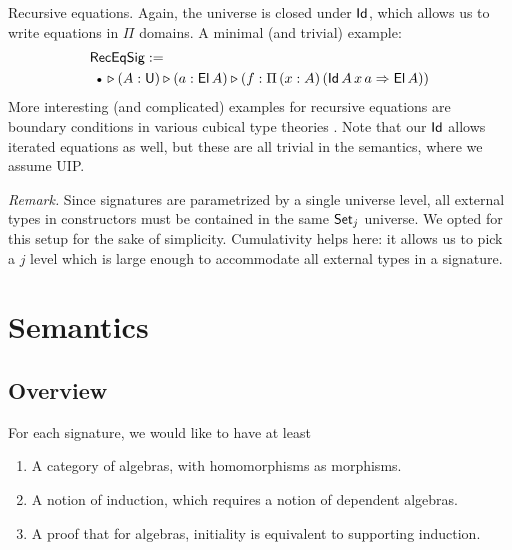 \documentclass[sigplan,review,anonymous]{acmart}\settopmatter{printfolios=true,printccs=false,printacmref=false}
\makeatletter
\newcommand{\Lift}{\Uparrow}
\newcommand{\ext}{\triangleright}
\newcommand{\emptycon}{\scaleobj{.75}\bullet}
\newcommand{\Pii}{\Pi}
\newcommand{\appitt}{\mathop{{\scriptstyle @}}}
\newcommand{\IdU}{\mathsf{IdU}}
\newcommand{\arri}{\Rightarrow}
\makeatother
\begin{document}

\begin{example}{Recursive equations}. Again, the universe is closed under $\mathsf{Id}$, which allows us to write equations
in $\Pii$ domains. A minimal (and trivial) example:
\begin{alignat*}{3}
  & \mathsf{RecEqSig} :=\\
  & \hspace{0.5em}\emptycon\,\ext (A : \U) \ext (a : \El\,A)\ext (f : \Pii\,(x : A)\,(\Id\,A\,x\,a\arri\El\,A))
\end{alignat*}
More interesting (and complicated) examples for recursive equations are boundary
conditions in various cubical type theories \cite{cohen2016cubical, angiuli2016computational, angiuli2018cartesian}. Note that our $\mathsf{Id}$
allows iterated equations as well, but these are all trivial in the semantics,
where we assume UIP.
\end{example}


\emph{Remark.} Since signatures are parametrized by a single universe level, all
external types in constructors must be contained in the same $\mathsf{Set}_j$
universe. We opted for this setup for the sake of simplicity. Cumulativity helps
here: it allows us to pick a $j$ level which is large enough to accommodate all
external types in a signature.


\section{Semantics}
\label{sec:semantics}

\subsection{Overview}\label{sec:overview}

For each signature, we would like to have at least
\begin{enumerate}
  \item A category of algebras, with homomorphisms as morphisms.
  \item A notion of induction, which requires a notion of dependent algebras.
  \item A proof that for algebras, initiality is equivalent to supporting induction.
\end{enumerate}
\end{document}
